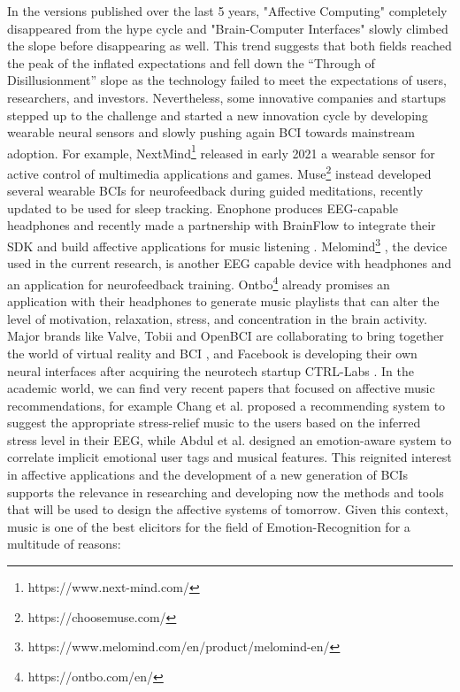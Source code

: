 In the versions published over the last 5 years, "Affective Computing" completely disappeared from the hype cycle and "Brain-Computer Interfaces" slowly climbed the slope before disappearing as well. This trend suggests that both fields reached the peak of the inflated expectations and fell down the “Through of Disillusionment” slope as the technology failed to meet the expectations of users, researchers, and investors. Nevertheless, some innovative companies and startups stepped up to the challenge and started a new innovation cycle by developing wearable neural sensors and slowly pushing again \ac{BCI} towards mainstream adoption. For example, NextMind\footnote{https://www.next-mind.com/}  released in early 2021 a wearable sensor for active control of multimedia applications and games. Muse\footnote{https://choosemuse.com/} instead developed several wearable \ac{BCIs} for neurofeedback during guided meditations, recently updated to be used for sleep tracking. Enophone produces EEG-capable headphones and recently made a partnership with BrainFlow to integrate their SDK and build affective applications for music listening \cite{parfenov_brainflow_nodate}. Melomind\footnote{https://www.melomind.com/en/product/melomind-en/} , the device used in the current research, is another EEG capable device with headphones and an application for neurofeedback training. Ontbo\footnote{https://ontbo.com/en/} already promises an application with their headphones to generate music playlists that can alter the level of motivation, relaxation, stress, and concentration in the brain activity. Major brands like Valve, Tobii and OpenBCI are collaborating to bring together the world of virtual reality and \ac{BCI} \cite{parfenov_openbci_nodate}, and Facebook is developing their own neural interfaces after acquiring the neurotech startup CTRL-Labs \cite{statt_facebook_2019}. In the academic world, we can find very recent papers that focused on affective music recommendations, for example Chang et al. \cite{chang_personalized_2017} proposed a recommending system to suggest the appropriate stress-relief music to the users based on the inferred stress level in their EEG, while Abdul et al. \cite{abdul_emotion-aware_2018} designed an emotion-aware system to correlate implicit emotional user tags and musical features. This reignited interest in affective applications and the development of a new generation of \ac{BCIs} supports the relevance in researching and developing now the methods and tools that will be used to design the affective systems of tomorrow. Given this context, music is one of the best elicitors for the field of Emotion-Recognition for a multitude of reasons: 
